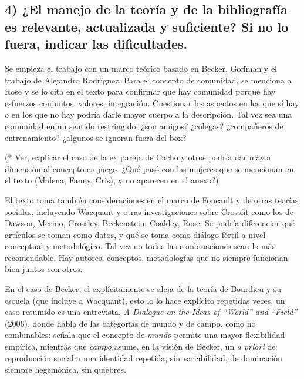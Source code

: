 \subsection*{4) ¿El manejo de la teoría y de la bibliografía es
relevante, actualizada y suficiente? Si no lo fuera, indicar las
dificultades.}\label{el-manejo-de-la-teoruxeda-y-de-la-bibliografuxeda-es-relevante-actualizada-y-suficiente-si-no-lo-fuera-indicar-las-dificultades.}


Se empieza el trabajo con un marco teórico basado en Becker, Goffman y el trabajo de Alejandro Rodríguez.
Para el concepto de comunidad, se menciona a Rose
y se lo cita en el texto para confirmar que hay comunidad porque hay esfuerzos conjuntos, valores, integración.
Cuestionar los aspectos en los que sí hay o en los que no hay podría darle mayor cuerpo a la descripción.
Tal vez sea una comunidad en un sentido restringido: ¿son amigos? ¿colegas? ¿compañeros de entrenamiento? 
¿algunos se ignoran fuera del box? 

(* Ver, explicar el caso de la ex pareja de Cacho y otros podría dar 
mayor dimensión al concepto en juego. ¿Qué pasó con las mujeres que se mencionan en el texto (Malena, Fanny, Cris), 
y no aparecen en el anexo?)

El texto toma también consideraciones en el marco de Foucault y  de otras teorías
sociales, incluyendo Wacquant y otras investigaciones sobre Crossfit como los de
Dawson, Merino, Crossley, Beckenstein, Coakley, Rose.
Se podría diferenciar qué artículos se toman como datos, y qué se toma como diálogo fértil
a nivel conceptual y metodológico.
Tal vez no todas las combinaciones sean lo más recomendable. 
Hay autores, conceptos, metodologías que no siempre funcionan bien juntos con otros.

En el caso de Becker, el explícitamente se aleja de la teoría de
Bourdieu y su escuela (que incluye a Wacquant), esto lo lo hace explícito repetidas veces, un caso resumido es una entrevista,
\textit{A Dialogue on the Ideas of “World” and “Field” }(2006),
donde habla de las categorías de mundo y de campo, como no combinables: señala que el concepto de
\textit{mundo} permite una mayor flexibilidad empírica, mientras que \textit{campo}
asume, en la visión de Becker, un \textit{a priori} de reproducción social a una identidad repetida, sin variabilidad,
de dominación siempre hegemónica, sin quiebres.


